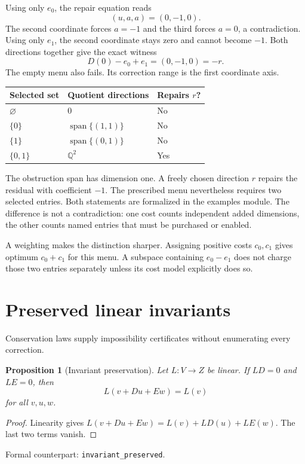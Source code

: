 \documentclass[11pt,letterpaper,oneside,openany]{book}
\theoremstyle{quiet}
\newtheorem{proposition}[theorem]{Proposition}
\newcommand{\Q}{\mathbb{Q}}
\DeclareMathOperator{\Span}{span}
\newcommand{\formal}[1]{\par\nobreak\begingroup\footnotesize\color{Slate}\sffamily Formal counterpart: \normalfont\nolinkurl{#1}.\par\endgroup}
\begin{document}
Using only $e_0$, the repair equation reads
\[
(u,a,a)=(0,-1,0).
\]
The second coordinate forces $a=-1$ and the third forces $a=0$, a contradiction. Using only $e_1$, the second coordinate stays zero and cannot become $-1$. Both directions together give the exact witness
\begin{equation}\label{eq:two-entry-witness}
D(0)-e_0+e_1=(0,-1,0)=-r.
\end{equation}
The empty menu also fails. Its correction range is the first coordinate axis.

\begin{center}
\begin{tabular}{@{}lll@{}}
\toprule
Selected set & Quotient directions & Repairs $r$?\\
\midrule
$\varnothing$ & $0$ & No\\
$\{0\}$ & $\Span\{(1,1)\}$ & No\\
$\{1\}$ & $\Span\{(0,1)\}$ & No\\
$\{0,1\}$ & $\Q^2$ & Yes\\
\bottomrule
\end{tabular}
\end{center}

The obstruction span has dimension one. A freely chosen direction $r$ repairs the residual with coefficient $-1$. The prescribed menu nevertheless requires two selected entries. Both statements are formalized in the examples module. The difference is not a contradiction: one cost counts independent added dimensions, the other counts named entries that must be purchased or enabled.

A weighting makes the distinction sharper. Assigning positive costs $c_0,c_1$ gives optimum $c_0+c_1$ for this menu. A subspace containing $e_0-e_1$ does not charge those two entries separately unless its cost model explicitly does so.

\section{Preserved linear invariants}
Conservation laws supply impossibility certificates without enumerating every correction.

\begin{proposition}[Invariant preservation]\label{prop:invariant}
Let $L:V\to Z$ be linear. If $LD=0$ and $LE=0$, then
\[
L(v+Du+Ew)=L(v)
\]
for all $v,u,w$.
\end{proposition}
\begin{proof}
Linearity gives $L(v+Du+Ew)=L(v)+LD(u)+LE(w)$. The last two terms vanish.
\end{proof}
\formal{invariant_preserved}
\end{document}
